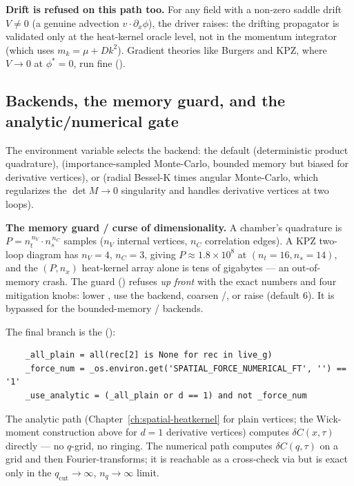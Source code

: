 \begin{gotcha}
\textbf{Drift is refused on this path too.} For any field with a non-zero saddle
drift $V\ne0$ (a genuine advection $v\cdot\partial_{x}\phi$), the driver raises:
the drifting propagator is validated only at the heat-kernel oracle level, not
in the momentum integrator (which uses $m_{k}=\mu+Dk^{2}$). Gradient theories
like Burgers and KPZ, where $V\to0$ at $\phi^{*}=0$, run fine
().
\end{gotcha}

\subsection{Backends, the memory guard, and the analytic/numerical gate}

The  environment variable selects the backend: the
default  (deterministic product quadrature), 
(importance-sampled Monte-Carlo, bounded memory but biased for derivative
vertices), or  (radial Bessel-K times angular Monte-Carlo, which
regularizes the $\det M\to0$ singularity and handles derivative vertices at two
loops).

\begin{gotcha}
\textbf{The memory guard / curse of dimensionality.} A chamber's quadrature is
$P=n_{t}^{\,n_{V}}\cdot n_{s}^{\,n_{C}}$ samples ($n_{V}$ internal vertices,
$n_{C}$ correlation edges). A KPZ two-loop diagram has $n_{V}=4$, $n_{C}=3$,
giving $P\approx1.8\times10^{8}$ at $(n_{t}{=}16,n_{s}{=}14)$, and the
$(P,n_{x})$ heat-kernel array alone is tens of gigabytes --- an out-of-memory
crash. The guard () refuses \emph{up front}
with the exact numbers and four mitigation knobs: lower , use the
 backend, coarsen /, or
raise  (default 6). It is bypassed for the
bounded-memory / backends.
\end{gotcha}

The final branch is the 
():
\begin{lstlisting}
    _all_plain = all(rec[2] is None for rec in live_g)
    _force_num = _os.environ.get('SPATIAL_FORCE_NUMERICAL_FT', '') == '1'
    _use_analytic = (_all_plain or d == 1) and not _force_num
\end{lstlisting}
The analytic path (Chapter~\ref{ch:spatial-heatkernel} for plain vertices; the
Wick-moment construction above for $d=1$ derivative vertices) computes
$\delta C(x,\tau)$ directly --- no $q$-grid, no ringing. The numerical path
computes $\delta C(q,\tau)$ on a grid and then Fourier-transforms; it is reachable
as a cross-check via  but is exact only in
the $q_{\text{cut}}\to\infty$, $n_{q}\to\infty$ limit.

